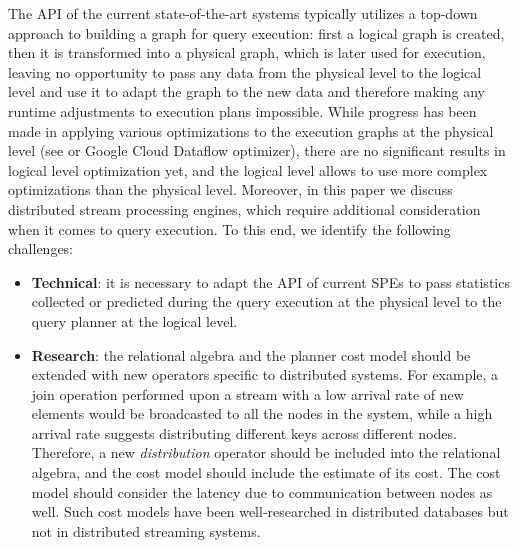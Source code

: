 The API of the current state-of-the-art systems typically utilizes a top-down approach to building a graph for query execution: first a logical graph is created, then it is transformed into a physical graph, which is later used for execution, leaving no opportunity to pass any data from the physical level to the logical level and use it to adapt the graph to the new data and therefore making any runtime adjustments to execution plans impossible. While progress has been made in applying various optimizations to the execution graphs at the physical level (see \cite{grulich2020grizzly} or Google Cloud Dataflow optimizer), there are no significant results in logical level optimization yet, and the logical level allows to use more complex optimizations than the physical level. Moreover, in this paper we discuss distributed stream processing engines, which require additional consideration when it comes to query execution. To this end, we identify the following challenges:

\begin{itemize}
    \item \textbf{Technical}: it is necessary to adapt the API of current SPEs to pass statistics collected or predicted during the query execution at the physical level to the query planner at the logical level.
    \item \textbf{Research}: the relational algebra and the planner cost model should be extended with new operators specific to distributed systems. For example, a join operation performed upon a stream with a low arrival rate of new elements would be broadcasted to all the nodes in the system, while a high arrival rate suggests distributing different keys across different nodes. Therefore, a new \textit{distribution} operator should be included into the relational algebra, and the cost model should include the estimate of its cost. The cost model should consider the latency due to communication between nodes as well. Such cost models have been well-researched in distributed databases \cite{kossmann2000thestate} but not in distributed streaming systems.
\end{itemize}





